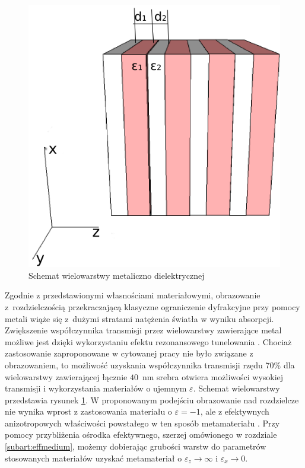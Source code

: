\begin{figure}[tbh]
	\includegraphics[width=.5\textwidth]{images/multilayer/multilayer-3d.png}
	\caption{Schemat wielowarstwy metaliczno dielektrycznej}
	\label{fig:mulschem}
\end{figure}


Zgodnie z przedstawionymi własnościami materiałowymi, obrazowanie z~rozdzielczością przekraczającą klasyczne ograniczenie dyfrakcyjne przy pomocy metali wiąże się z~dużymi stratami natężenia światła w wyniku absorpcji. Zwiększenie współczynnika transmisji przez wielowarstwy zawierające metal możliwe jest dzięki wykorzystaniu efektu rezonansowego tunelowania \cite{scalora-transparentmetal}. Chociaż zastosowanie zaproponowane w cytowanej pracy nie było związane z obrazowaniem, to możliwość uzyskania współczynnika transmisji rzędu 70\% dla wielowarstwy zawierającej łącznie $40$~nm srebra otwiera możliwości wysokiej transmisji i wykorzystania materiałów o ujemnym $\varepsilon$. Schemat wielowarstwy przedstawia rysunek \ref{fig:mulschem}. W proponowanym podejściu obrazowanie nad rozdzielcze nie wynika wprost z zastosowania materiału o $\varepsilon = -1$, ale z efektywnych anizotropowych właściwości powstałego w ten sposób  metamateriału \cite{ramakrishna2003imaging}. Przy pomocy przybliżenia ośrodka efektywnego, szerzej omówionego w rozdziale \ref{subart:effmedium}, możemy dobierając grubości warstw do parametrów stosowanych materiałów uzyskać metamateriał o $\varepsilon_z \to \infty$ i $\varepsilon_x \to 0$.


